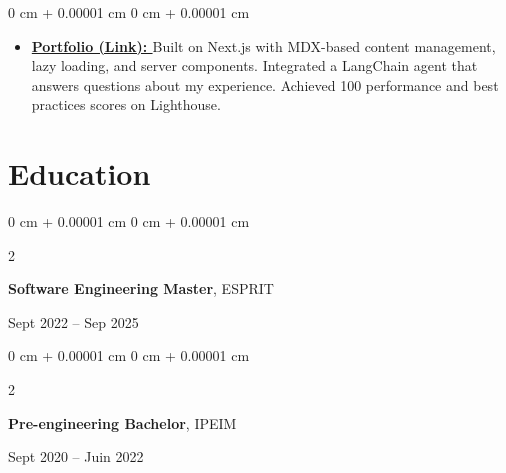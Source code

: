 \documentclass[10pt, letterpaper]{article}
\newenvironment{highlights}{
  \begin{itemize}[
    topsep=0.10 cm,
    parsep=0.10 cm,
    partopsep=0pt,
    itemsep=0pt,
    leftmargin=0 cm + 10pt
    ]
  }{
\end{itemize}
}
\newenvironment{onecolentry}{
  \begin{adjustwidth}{
      0 cm + 0.00001 cm
    }{
      0 cm + 0.00001 cm
    }
  }{
  \end{adjustwidth}
} %
\newenvironment{twocolentry}[2][]{
  \onecolentry
  \def\secondColumn{#2}
  \setcolumnwidth{\fill, 4.5 cm}
  \begin{paracol}{2}
  }{
    \switchcolumn \raggedleft \secondColumn
  \end{paracol}
  \end{onecolentry}
} %
\begin{document}
\vspace{0.2 cm}
\begin{onecolentry}
  \begin{highlights}
  \item \textbf{\href{https://ihebbelhadj.vercel.app/projects/elder_care_saas}{Portfolio (Link): }} Built on Next.js with MDX-based content management, lazy loading, and server components. Integrated a LangChain agent that answers questions about my experience. Achieved 100 performance and best practices scores on Lighthouse.

  \end{highlights}
\end{onecolentry}

  \section{Education}





  \begin{twocolentry}{
      Sept 2022 – Sep 2025
    }
    \textbf{Software Engineering Master}, ESPRIT
  \end{twocolentry}

  \vspace{0.10 cm}

  \begin{twocolentry}{
      Sept 2020 – Juin 2022
    }
    \textbf{Pre-engineering Bachelor}, IPEIM
  \end{twocolentry}




  
\end{document}
